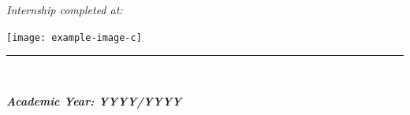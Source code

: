 \begin{center}
    \vspace{1cm}

    {\large\itshape{Internship completed at:}\/\par}
    \vspace{0.2cm}
    \texttt{[image: example-image-c]} %

    \vfill

    \begin{center}
        \rule{0.5\textwidth}{1pt}\\[0.1cm]
        {\large\bfseries\itshape{Academic Year: YYYY/YYYY}\/\par}
    \end{center}
    
\end{center}

\restoregeometry{}